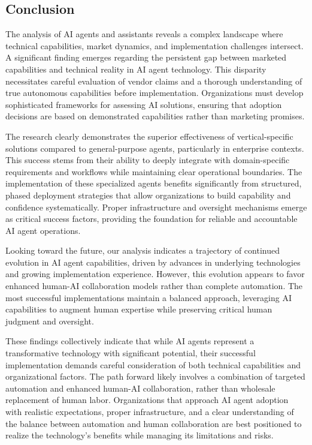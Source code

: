 \documentclass[
]{article}
\begin{document}
\subsection{Conclusion}\label{conclusion}

The analysis of AI agents and assistants reveals a complex landscape
where technical capabilities, market dynamics, and implementation
challenges intersect. A significant finding emerges regarding the
persistent gap between marketed capabilities and technical reality in AI
agent technology. This disparity necessitates careful evaluation of
vendor claims and a thorough understanding of true autonomous
capabilities before implementation. Organizations must develop
sophisticated frameworks for assessing AI solutions, ensuring that
adoption decisions are based on demonstrated capabilities rather than
marketing promises.

The research clearly demonstrates the superior effectiveness of
vertical-specific solutions compared to general-purpose agents,
particularly in enterprise contexts. This success stems from their
ability to deeply integrate with domain-specific requirements and
workflows while maintaining clear operational boundaries. The
implementation of these specialized agents benefits significantly from
structured, phased deployment strategies that allow organizations to
build capability and confidence systematically. Proper infrastructure
and oversight mechanisms emerge as critical success factors, providing
the foundation for reliable and accountable AI agent operations.

Looking toward the future, our analysis indicates a trajectory of
continued evolution in AI agent capabilities, driven by advances in
underlying technologies and growing implementation experience. However,
this evolution appears to favor enhanced human-AI collaboration models
rather than complete automation. The most successful implementations
maintain a balanced approach, leveraging AI capabilities to augment
human expertise while preserving critical human judgment and oversight.

These findings collectively indicate that while AI agents represent a
transformative technology with significant potential, their successful
implementation demands careful consideration of both technical
capabilities and organizational factors. The path forward likely
involves a combination of targeted automation and enhanced human-AI
collaboration, rather than wholesale replacement of human labor.
Organizations that approach AI agent adoption with realistic
expectations, proper infrastructure, and a clear understanding of the
balance between automation and human collaboration are best positioned
to realize the technology's benefits while managing its limitations and
risks.
\end{document}
